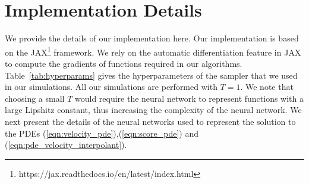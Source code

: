 \section{Implementation Details}\label{apndx:implemnetation_details}
We provide the details of our implementation here. Our implementation is based on the JAX\footnote{https://jax.readthedocs.io/en/latest/index.html} framework. We rely on the automatic differentiation feature in JAX to compute the gradients of functions required in our algorithms. Table~\ref{tab:hyperparams} gives the hyperparameters of the sampler that we used in our simulations. 
 All our simulations are performed with $T=1$. We note that choosing a small $T$ would require the neural network to represent functions with a large Lipshitz constant, thus increasing the complexity of the neural network. We next present the details of the neural networks used to represent the solution to the PDEs (\ref{eqn:velocity_pde}),(\ref{eqn:score_pde}) and (\ref{eqn:pde_velocity_interpolant}). 

